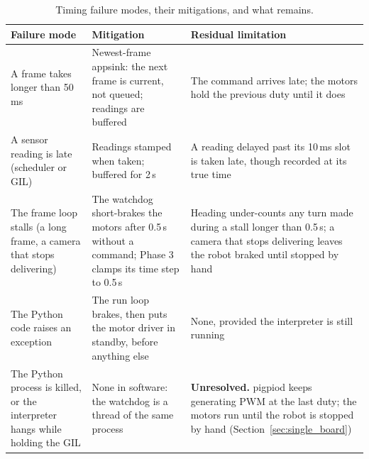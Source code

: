 \begin{table}[H]
      \centering
      \caption{Timing failure modes, their mitigations, and what remains.}
      \label{tab:timing-failures}
      \small
      \begin{tabularx}{\textwidth}{@{}XXX@{}}
            \toprule
            \textbf{Failure mode} & \textbf{Mitigation}                                                                                                                                    & \textbf{Residual limitation} \\
            \midrule
            A frame takes longer than 50\,ms
                                  & Newest-frame appsink: the next frame is current, not queued; readings are buffered
                                  & The command arrives late; the motors hold the previous duty until it does                                                                                                             \\
            A sensor reading is late (scheduler or GIL)
                                  & Readings stamped when taken; buffered for 2\,s
                                  & A reading delayed past its 10\,ms slot is taken late, though recorded at its true time                                                                                                \\
            The frame loop stalls (a long frame, a camera that stops delivering)
                                  & The watchdog short-brakes the motors after 0.5\,s without a command; Phase 3 clamps its time step to 0.5\,s
                                  & Heading under-counts any turn made during a stall longer than 0.5\,s; a camera that stops delivering leaves the robot braked until stopped by hand                                    \\
            The Python code raises an exception
                                  & The run loop brakes, then puts the motor driver in standby, before anything else
                                  & None, provided the interpreter is still running                                                                                                                                       \\
            The Python process is killed, or the interpreter hangs while holding the GIL
                                  & None in software: the watchdog is a thread of the same process
                                  & \textbf{Unresolved.} pigpiod keeps generating PWM at the last duty; the motors run until the robot is stopped by hand (Section~\ref{sec:single_board})                                \\

\end{tabularx}
\end{table}
